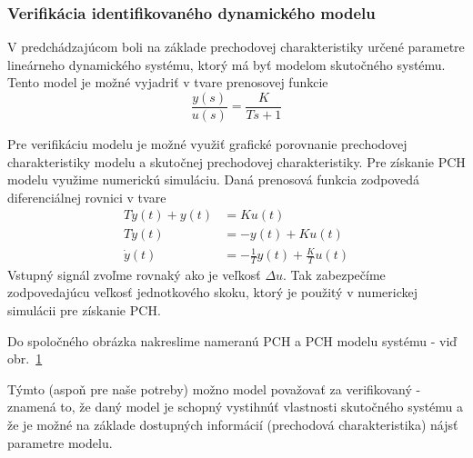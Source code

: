\documentclass[a4paper, 10pt, ]{article}
\begin{document}
\subsubsection{Verifikácia identifikovaného dynamického modelu}


V predchádzajúcom boli na základe prechodovej charakteristiky určené parametre lineárneho dynamického systému, ktorý má byť modelom skutočného systému. Tento model je možné vyjadriť v tvare prenosovej funkcie
\begin{equation}
    \frac{y(s)}{u(s)} = \frac{K}{Ts+1}
\end{equation}



Pre verifikáciu modelu je možné využiť grafické porovnanie prechodovej charakteristiky modelu a skutočnej prechodovej charakteristiky. Pre získanie PCH modelu využime numerickú simuláciu. Daná prenosová funkcia zodpovedá diferenciálnej rovnici v tvare
\begin{align}
    T \dot y(t) + y(t) &= K u(t) \\
    T \dot y(t) &= - y(t) + K u(t) \\
    \dot y(t) &= - \frac{1}{T} y(t) + \frac{K}{T} u(t)
\end{align}
Vstupný signál zvoľme rovnaký ako je veľkosť $\Delta u$. Tak zabezpečíme zodpovedajúcu veľkosť jednotkového skoku, ktorý je použitý v numerickej simulácii pre získanie PCH.

Do spoločného obrázka nakreslime nameranú PCH a PCH modelu systému - viď obr.~\ref{graf40}

\begin{figure}[t]
	\centering


    \vspace{-4mm}

	\caption{}
	\label{graf40}

\end{figure}

Týmto (aspoň pre naše potreby) možno model považovať za verifikovaný - znamená to, že daný model je schopný vystihnúť vlastnosti skutočného systému a že je možné na základe dostupných informácií (prechodová charakteristika) nájsť parametre modelu.
\end{document}
